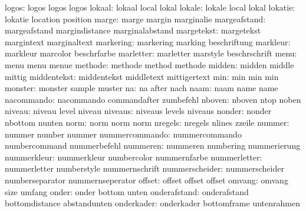               logos:  logos                logos               logos
             lokaal:  lokaal               local               lokal
             lokale:  lokale               local               lokal
            lokatie:  lokatie              location            position
              marge:  marge                margin              marginalie
       margeafstand:  margeafstand         margindistance      marginalabstand
         margetekst:  margetekst           margintext          marginaltext
          markering:  markering            marking             beschriftung
           markleur:  markleur             marcolor            beschrfarbe
          marletter:  marletter            marstyle            beschrschrift
               menu:  menu                 menu                menue
            methode:  methode              method              methode
             midden:  midden               middle              mittig
        middentekst:  middentekst          middletext          mittigertext
                min:  min                  min                 min
            monster:  monster              sample              muster
                 na:  na                   after               nach
               naam:  naam                 name                name
         nacommando:  nacommando           commandafter        zumbefehl
             nboven:  nboven               ntop                noben
             niveau:  niveau               level               niveau
            niveaus:  niveaus              levels              niveaus
             nonder:  nonder               nbottom             nunten
               norm:  norm                 norm                norm
            nregels:  nregels              nlines              zzeile
             nummer:  nummer               number              nummer
     nummercommando:  nummercommando       numbercommand       nummerbefehl
           nummeren:  nummeren             numbering           nummerierung
        nummerkleur:  nummerkleur          numbercolor         nummernfarbe
       nummerletter:  nummerletter         numberstyle         nummernschrift
     nummerscheider:  nummerscheider       numberseparator     nummernseperator
             offset:  offset               offset              offset
             omvang:  omvang               size                umfang
              onder:  onder                bottom              unten
       onderafstand:  onderafstand         bottomdistance      abstandunten
         onderkader:  onderkader           bottomframe         untenrahmen
